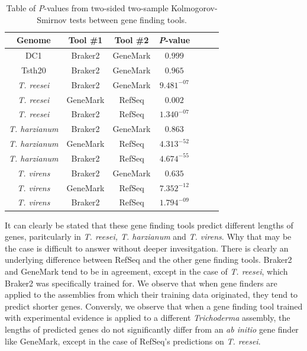 \begin{table}
  \begin{center}
    \begin{tabular}{|c|c|c|c|c|c|c|}
      \hline
      Genome & Tool \#1 & Tool \#2 & \textit{P}-value  \\ \hline
      DC1 & Braker2 & GeneMark & $0.999$ \\ \hline
      Tsth20 & Braker2 & GeneMark & $0.965$ \\ \hline
      \textit{T. reesei} & Braker2 & GeneMark & $9.481^{-07}$ \\ \hline
      \textit{T. reesei} & GeneMark & RefSeq & $0.002$ \\ \hline
      \textit{T. reesei} & Braker2 & RefSeq & $1.340^{-07}$ \\ \hline
      \textit{T. harzianum} & Braker2 & GeneMark & $0.863$ \\ \hline
      \textit{T. harzianum} & GeneMark & RefSeq & $4.313^{-52}$ \\ \hline
      \textit{T. harzianum} & Braker2 & RefSeq & $4.674^{-55}$ \\ \hline
      \textit{T. virens} & Braker2 & GeneMark & $0.635$ \\ \hline
      \textit{T. virens} & GeneMark & RefSeq & $7.352^{-12}$ \\ \hline
      \textit{T. virens} & Braker2 & RefSeq & $1.794^{-09}$ \\ \hline
    \end{tabular}
  \end{center}
  \caption{Table of \textit{P}-values from two-sided two-sample
    Kolmogorov-Smirnov tests between gene finding tools.}
  \label{table:ks-2s}
\end{table}

It can clearly be stated that these gene finding tools predict
different lengths of genes, paritcularly in \textit{T. reesei,
  T. harzianum} and \textit{T. virens}. Why that may be the case is
difficult to answer without deeper invesitgation. There is clearly an
underlying difference between RefSeq and the other gene finding
tools. Braker2 and GeneMark tend to be in agreement, except in the
case of \textit{T. reesei}, which Braker2 was specifically trained
for. We observe that when gene finders are applied to the assemblies
from which their training data originated, they tend to predict
shorter genes. Conversly, we observe that when a gene finding tool
trained with experimental evidence is applied to a different
\textit{Trichoderma} assembly, the lengths of predicted genes do not
significantly differ from an \textit{ab initio} gene finder like
GeneMark, except in the case of RefSeq's predictions on
\textit{T. reesei}.

